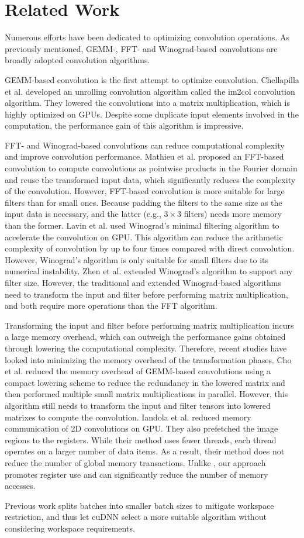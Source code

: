 \section{Related Work}
Numerous efforts have been dedicated to optimizing convolution operations. As previously mentioned, GEMM-, FFT- and
Winograd-based convolutions are broadly adopted convolution algorithms.

GEMM-based convolution is the first attempt to optimize convolution. Chellapilla et al. \cite{Chellapilla2006High} developed an unrolling
convolution algorithm  called the im2col convolution algorithm. They lowered the convolutions into a matrix multiplication, which is
highly optimized on GPUs. Despite some duplicate input elements involved in the computation, the performance gain of this algorithm is impressive.

FFT- and Winograd-based convolutions can reduce computational complexity and improve convolution performance. Mathieu et al.
\cite{mathieu2013fast} proposed an FFT-based convolution to compute convolutions as pointwise products in the Fourier domain and reuse the
transformed input data, which significantly reduces the complexity of the convolution. However, FFT-based convolution is more suitable for large filters than
for small ones. Because padding the filters to the same size as the input data is necessary, and  the latter (e.g., $3 \times 3$ filters) needs
more memory than the former. Lavin et al. \cite{lavin2016fast} used Winograd's minimal filtering algorithm to
accelerate the convolution on GPU. This algorithm can reduce the arithmetic complexity of convolution by up to four times compared with
direct convolution. However, Winograd's algorithm is only suitable for small filters due to its numerical instability.
Zhen et al. \cite{Zhen2018Optimizing} extended Winograd's algorithm to support any filter size. However, the traditional and extended Winograd-based
algorithms need to transform the input and filter before performing matrix multiplication, and both require more operations than the FFT algorithm.

Transforming the input and filter before performing matrix multiplication incurs a large memory overhead, which can outweigh the
performance gains obtained through lowering the computational complexity. Therefore, recent studies have looked into minimizing the memory
overhead of the transformation phases. Cho et al. \cite{cho2017mec} reduced the memory overhead of GEMM-based convolutions using a compact
lowering scheme to reduce the redundancy in the lowered matrix and then performed multiple small matrix multiplications in parallel.
However, this algorithm still needs to transform the input and filter tensors into lowered matrixes to compute the convolution. Iandola et
al. \cite{Iandola2014Communication} reduced memory communication of 2D convolutions on GPU. They also prefetched the image regions to the
registers. While their method uses fewer threads, each thread operates on a larger number of data items. As a result, their method does not
reduce the number of global memory transactions. Unlike \cite{Iandola2014Communication}, our approach promotes register use and can
significantly reduce the number of memory accesses.

Previous work \cite{oyama2018accelerating} splits batches into smaller batch sizes to mitigate workspace restriction, and thus let cuDNN select a more suitable algorithm without considering workspace requirements.
